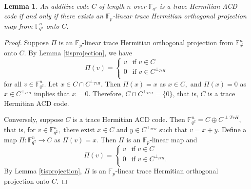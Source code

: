 \documentclass[sn-mathphys-num]{sn-jnl}%
\theoremstyle{thmstyleone}%
\newtheorem{lemma}[theorem]{Lemma}
\theoremstyle{thmstyletwo}%
\theoremstyle{thmstylethree}%
\begin{document}
\begin{lemma}\label{orthogonal}
	An additive code $C$ of length $n$ over $\mathbb{F}_{q^2}$ is a trace Hermitian ACD code if and only if there exists an $\mathbb{F}_p$-linear trace Hermitian orthogonal projection map from $\mathbb{F}_{q^2}^n$ onto $C.$
\end{lemma}
\begin{proof}
	Suppose $\Pi$ is an $\mathbb{F}_p$-linear trace Hermitian orthogonal projection  from $\mathbb{F}_{q^2}^n$ onto $ C.$ By Lemma \ref{tisprojection}, we have 
	\begin{equation*}
		\Pi(v)=\begin{cases}
			v\ \ \text{ if } v\in C \\
			0 \ \ \text{ if }v\in C^{\perp_{TrH}}\\
		\end{cases}
	\end{equation*} 
	for all $v\in \mathbb{F}_{q^2}^n.$ Let $x\in C\cap C^{\perp_{TrH}}.$ Then $\Pi(x)=x$ as $x\in C,$ and $\Pi(x)=0$ as $x\in C^{\perp_{TrH}}$ implies that $x=0.$ Therefore, $ C\cap C^{\perp_{TrH}}=\{0\}$, that is, $C$ is a trace Hermitian ACD code.
	
	Conversely, suppose $C$ is a trace Hermitian ACD code. Then $\mathbb{F}_{q^2}^n=C\oplus C^{\perp{TrH}},$ that is, for $v\in \mathbb{F}_{q^2}^n,$ there exist $x\in C$ and $y \in C^{\perp_{TrH}}$ such that $v=x+y.$ Define a map $\Pi: \mathbb{F}_{q^2}^n \to C $ as $\Pi(v)=x.$ Then $\Pi$ is an $\mathbb{F}_p$-linear map and 
	\begin{equation*}
		\Pi(v)=\begin{cases}
			v\ \ \text{ if } v\in C \\
			0 \ \ \text{ if }v\in C^{\perp_{TrH}}.\\
		\end{cases}
	\end{equation*} 
	By Lemma \ref{tisprojection}, $\Pi$ is an $\mathbb{F}_p$-linear trace Hermitian  orthogonal projection onto $C.$ 
\end{proof}
\end{document}
